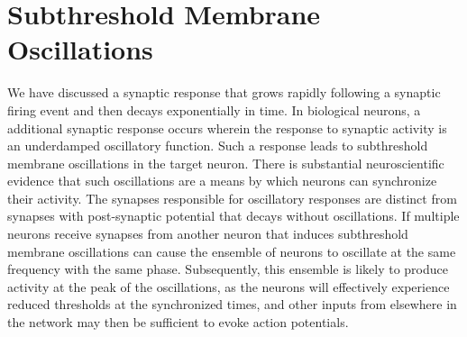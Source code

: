 \documentclass[]{article}
\begin{document}
\section{\label{sec:subthreshold_oscillations}Subthreshold Membrane Oscillations}
We have discussed a synaptic response that grows rapidly following a synaptic firing event and then decays exponentially in time. In biological neurons, a additional synaptic response occurs wherein the response to synaptic activity is an underdamped oscillatory function. Such a response leads to subthreshold membrane oscillations in the target neuron. There is substantial neuroscientific evidence that such oscillations are a means by which neurons can synchronize their activity. The synapses responsible for oscillatory responses are distinct from synapses with post-synaptic potential that decays without oscillations. If multiple neurons receive synapses from another neuron that induces subthreshold membrane oscillations can cause the ensemble of neurons to oscillate at the same frequency with the same phase. Subsequently, this ensemble is likely to produce activity at the peak of the oscillations, as the neurons will effectively experience reduced thresholds at the synchronized times, and other inputs from elsewhere in the network may then be sufficient to evoke action potentials.
\end{document}

